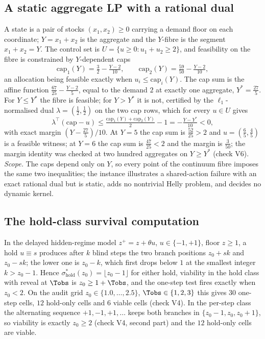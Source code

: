 \subsection{A static aggregate LP with a rational dual}\label{S:aggregateLP}
A state is a pair of stocks $(x_1,x_2)\ge0$ carrying a demand floor on each coordinate; $Y=x_1+x_2$ is the aggregate and the $Y$-fibre is the segment $x_1+x_2=Y$. The control set is $U=\{u\ge0:u_1+u_2\ge2\}$, and feasibility on the fibre is constrained by $Y$-dependent caps
\[
\mathrm{cap}_1(Y)=\tfrac32-\tfrac{Y-2}{10},\qquad\mathrm{cap}_2(Y)=\tfrac{59}{50}-\tfrac{Y-2}{10},
\]
an allocation being feasible exactly when $u_i\le\mathrm{cap}_i(Y)$. The cap sum is the affine function $\tfrac{67}{25}-\tfrac{Y-2}{5}$, equal to the demand $2$ at exactly one aggregate, $Y^*=\tfrac{27}{5}$. For $Y\le Y^*$ the fibre is feasible; for $Y>Y^*$ it is not, certified by the $\ell_1$-normalised dual $\lambda=(\tfrac12,\tfrac12)$ on the two cap rows, which for every $u\in U$ gives
\[
\lambda^\top(\mathrm{cap}-u)\le\tfrac{\mathrm{cap}_1(Y)+\mathrm{cap}_2(Y)}2-1=-\tfrac{Y-Y^*}{10}<0,
\]
with exact margin $(Y-\tfrac{27}5)/10$. At $Y=5$ the cap sum is $\tfrac{52}{25}>2$ and $u=(\tfrac65,\tfrac45)$ is a feasible witness; at $Y=6$ the cap sum is $\tfrac{47}{25}<2$ and the margin is $\tfrac3{50}$; the margin identity was checked at two hundred aggregates on $Y\ge Y^*$ (check V6). \emph{Scope.} The caps depend only on $Y$, so every point of the continuum fibre imposes the same two inequalities; the instance illustrates a shared-action failure with an exact rational dual but is static, adds no nontrivial Helly problem, and decides no dynamic kernel.

\subsection{The hold-class survival computation}\label{S:holdclass}
In the delayed hidden-regime model $z^+=z+\theta u$, $u\in\{-1,+1\}$, floor $z\ge1$, a hold $u\equiv s$ produces after $k$ blind steps the two branch positions $z_0+s k$ and $z_0-sk$; the lower one is $z_0-k$, which first drops below $1$ at the smallest integer $k>z_0-1$. Hence $\sigma^*_{\mathrm{hold}}(z_0)=\lfloor z_0-1\rfloor$ for either hold, viability in the hold class with reveal at $\Tobs$ is $z_0\ge1+\Tobs$, and the one-step test fires exactly when $z_0<2$. On the audit grid $z_0\in\{1.0,\dots,2.5\}$, $\Tobs\in\{1,2,3\}$ this gives $30$ one-step cells, $12$ hold-only cells and $6$ viable cells (check V4). In the per-step class the alternating sequence $+1,-1,+1,\dots$ keeps both branches in $\{z_0-1,z_0,z_0+1\}$, so viability is exactly $z_0\ge2$ (check V4, second part) and the $12$ hold-only cells are viable.

